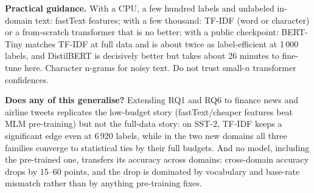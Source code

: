 \documentclass[11pt,a4paper]{article}
\begin{document}
\textbf{Practical guidance.} With a CPU, a few hundred labels and unlabeled in-domain text: fastText features; with a few thousand: TF-IDF (word or character) or a from-scratch transformer that is no better; with a public checkpoint: BERT-Tiny matches TF-IDF at full data and is about twice as label-efficient at 1\,000 labels, and DistilBERT is decisively better but takes about 26 minutes to fine-tune here. Character n-grams for noisy text. Do not trust small-$n$ transformer confidences.

\textbf{Does any of this generalise?} Extending RQ1 and RQ6 to finance news and airline tweets replicates the low-budget story (fastText/cheaper features beat MLM pre-training) but not the full-data story: on SST-2, TF-IDF keeps a significant edge even at 6\,920 labels, while in the two new domains all three families converge to statistical ties by their full budgets. And no model, including the pre-trained one, transfers its accuracy across domains: cross-domain accuracy drops by 15--60 points, and the drop is dominated by vocabulary and base-rate mismatch rather than by anything pre-training fixes.
\end{document}
